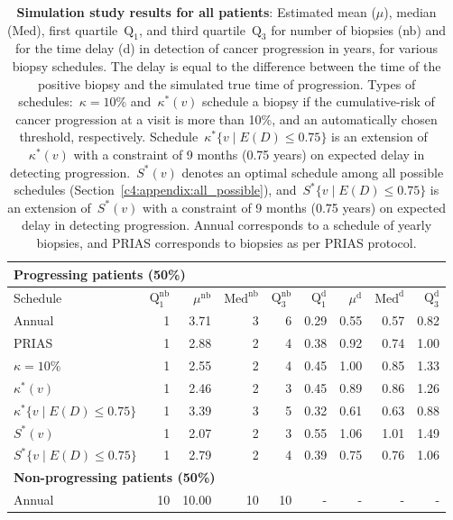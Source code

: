 \begin{subappendices}
\begin{table}
\small
\centering
\caption{\textbf{Simulation study results for all patients}: Estimated mean ($\mu$), median (Med), first quartile~$\mbox{Q}_1$, and third quartile~$\mbox{Q}_3$ for number of biopsies (nb) and for the time delay (d) in detection of cancer progression in years, for various biopsy schedules. The delay is equal to the difference between the time of the positive biopsy and the simulated true time of progression. Types of schedules:~${\kappa=10\%}$ and~$\kappa^*(v)$ schedule a biopsy if the cumulative-risk of cancer progression at a visit is more than 10\%, and an automatically chosen threshold, respectively. Schedule~${\kappa^*\{v \mid E(D)\leq 0.75\}}$ is an extension of~$\kappa^*(v)$ with a constraint of 9 months (0.75 years) on expected delay in detecting progression.~$S^*(v)$ denotes an optimal schedule among all possible schedules (Section~\ref{c4:appendix:all_possible}), and~$S^*\{v \mid E(D)\leq 0.75\}$ is an extension of~$S^*(v)$ with a constraint of 9 months (0.75 years) on expected delay in detecting progression. Annual corresponds to a schedule of yearly biopsies, and PRIAS corresponds to biopsies as per PRIAS protocol.}
\label{c4:table:extended_simres}
\begin{tabular}{l|rrrr|rrrr}
\toprule
\multicolumn{9}{l}{\textbf{Progressing patients (50\%)}}\\
\midrule
Schedule & $\mbox{Q}_1^{\mbox{nb}}$ & $\mu^{\mbox{nb}}$ & $\mbox{Med}^{\mbox{nb}}$ & $\mbox{Q}_3^{\mbox{nb}}$ & $\mbox{Q}_1^{\mbox{d}}$ & $\mu^{\mbox{d}}$ & $\mbox{Med}^{\mbox{d}}$  & $\mbox{Q}_3^{\mbox{d}}$ \\
\midrule
Annual        & 1  & 3.71 & 3  & 6  & 0.29 & 0.55 & 0.57 & 0.82\\
PRIAS         & 1  & 2.88 & 2  & 4  & 0.38 & 0.92 & 0.74 & 1.00\\
$\kappa=10\%$ & 1  & 2.55 & 2  & 4  & 0.45 & 1.00 & 0.85 & 1.33\\
$\kappa^*(v)$ & 1  & 2.46 & 2  & 3  & 0.45 & 0.89 & 0.86 & 1.26\\
$\kappa^*\{v \mid E(D)\leq 0.75\}$ & 1  & 3.39 & 3  & 5  & 0.32 & 0.61 & 0.63 & 0.88\\
$S^*(v)$ & 1  & 2.07 & 2  & 3  & 0.55 & 1.06 & 1.01 & 1.49\\
$S^*\{v \mid E(D)\leq 0.75\}$ & 1  & 2.79 & 2  & 4  & 0.39 & 0.75 & 0.76 & 1.06\\
\midrule
\multicolumn{9}{l}{\textbf{Non-progressing patients (50\%)}}\\
\midrule
Annual         & 10 & 10.00   & 10 & 10 & - & - & - & -\\

\end{tabular}
\end{table}
\end{subappendices}
